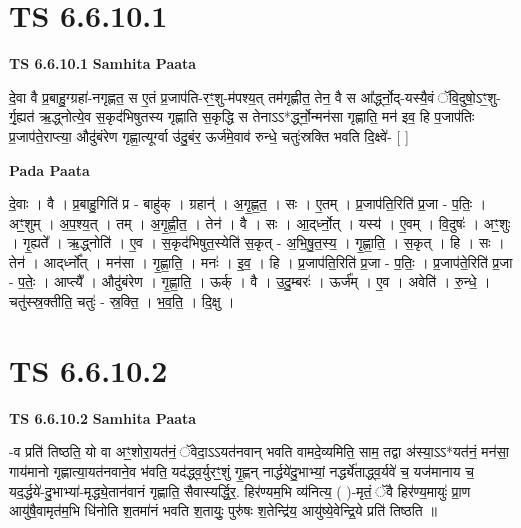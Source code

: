 \documentclass[17pt]{extarticle}
\begin{document}

\section{ TS 6.6.10.1 }

\textbf{TS 6.6.10.1 } \newline
\textbf{Samhita Paata} \newline

दे॒वा वै प्र॒बाहु॒ग्ग्रहा॑-नगृह्णत॒ स ए॒तं प्र॒जाप॑ति-रꣳ॒॒शु-म॑पश्य॒त् तम॑गृह्णीत॒ तेन॒ वै स आ᳚र्द्ध्नो॒द्-यस्यै॒वं ॅवि॒दुषो॒ऽꣳ॒शु-र्गृ॒ह्यत॑ ऋ॒द्ध्नोत्ये॒व स॒कृद॑भिषुतस्य गृह्णाति स॒कृद्धि स तेनाऽऽ*र्द्ध्नो॒न्मन॑सा गृह्णाति॒ मन॑ इव॒ हि प॒जाप॑तिः प्र॒जाप॑ते॒राप्त्या॒ औदु॑बंरेण गृह्णा॒त्यूर्ग्वा उ॑दु॒बंर॒ ऊर्ज॑मे॒वाव॑ रुन्धे॒ चतुः॑स्रक्ति भवति दि॒क्ष्वे॑- [  ] \newline

\textbf{Pada Paata} \newline

दे॒वाः । वै । प्र॒बाहु॒गिति॑ प्र - बाहु॑क् । ग्रहान्॑ । अ॒गृ॒ह्ण॒त॒ । सः । ए॒तम् । प्र॒जाप॑ति॒रिति॑ प्र॒जा - प॒तिः॒ । अꣳ॒॒शुम् । अ॒प॒श्य॒त् । तम् । अ॒गृ॒ह्णी॒त॒ । तेन॑ । वै । सः । आ॒द्‌र्ध्नो॒त् । यस्य॑ । ए॒वम् । वि॒दुषः॑ । अꣳ॒॒शुः । गृ॒ह्यते᳚ । ऋ॒द्ध्नोति॑ । ए॒व । स॒कृद॑भिषुत॒स्येति॑ स॒कृत् - अ॒भि॒षु॒त॒स्य॒ । गृ॒ह्णा॒ति॒ । स॒कृत् । हि । सः । तेन॑ । आद्‌र्ध्नो᳚त् । मन॑सा । गृ॒ह्णा॒ति॒ । मनः॑ । इ॒व॒ । हि । प्र॒जाप॑ति॒रिति॑ प्र॒जा - प॒तिः॒ । प्र॒जाप॑ते॒रिति॑ प्र॒जा - प॒तेः॒ । आप्त्यै᳚ । औदु॑बंरेण । गृ॒ह्णा॒ति॒ । ऊर्क् । वै । उ॒दु॒म्बरः॑ । ऊर्ज᳚म् । ए॒व । अवेति॑ । रु॒न्धे॒ । चतु॑स्स्र॒क्तीति॒ चतुः॑ - स्र॒क्ति॒ । भ॒व॒ति॒ । दि॒क्षु ।  \newline





\section{ TS 6.6.10.2 }

\textbf{TS 6.6.10.2 } \newline
\textbf{Samhita Paata} \newline

-व प्रति॑ तिष्ठति॒ यो वा अꣳ॒॒शोरा॒यत॑नं॒ ॅवेदा॒ऽऽयत॑नवान् भवति वामदे॒व्यमिति॒ साम॒ तद्वा अ॑स्या॒ऽऽ*यत॑नं॒ मन॑सा॒ गाय॑मानो गृह्णात्या॒यत॑नवाने॒व भ॑वति॒ यद॑द्ध्व॒र्युरꣳ॒॒शुं गृ॒ह्णन् नार्द्धये॑दु॒भाभ्यां॒ नर्द्ध्ये॑ताद्ध्व॒र्यवे॑ च॒ यज॑मानाय च॒ यद॒र्द्धये॑-दु॒भाभ्या॑-मृद्ध्ये॒तान॑वानं गृह्णाति॒ सैवास्यर्द्धि॒र॒. हिर॑ण्यम॒भि व्य॑नित्य॒ ( )-मृतं॒ ॅवै हिर॑ण्य॒मायुः॑ प्रा॒ण आयु॑षै॒वामृत॑म॒भि धि॑नोति श॒तमा॑नं भवति श॒तायुः॒ पुरु॑षः श॒तेन्द्रि॑य॒ आयु॑ष्ये॒वेन्द्रि॒ये प्रति॑ तिष्ठति ॥ \newline
\end{document}
